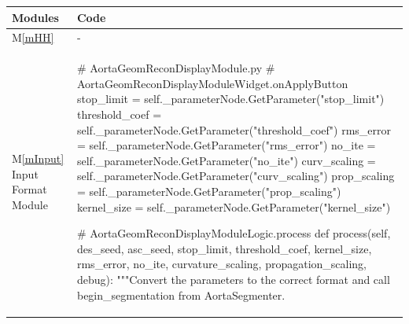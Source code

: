 \documentclass[12pt, titlepage]{article}
\newcommand{\mref}[1]{M\ref{#1}}
\begin{document}
\newpage

\begin{longtable}[H]{p{} p{} p{}}
\toprule
\multicolumn{2}{p{0.1\textwidth}}{\textbf{Modules}} & \textbf{Code}\\
\midrule
\multicolumn{2}{p{0.1\textwidth}}{\mref{mHH}} & - \\
\multicolumn{2}{p{0.1\textwidth}}{\mref{mInput} Input Format Module} & \begin{python}
# AortaGeomReconDisplayModule.py
# AortaGeomReconDisplayModuleWidget.onApplyButton
stop_limit = self._parameterNode.GetParameter("stop_limit")
threshold_coef = self._parameterNode.GetParameter("threshold_coef")
rms_error = self._parameterNode.GetParameter("rms_error")
no_ite = self._parameterNode.GetParameter("no_ite")
curv_scaling = self._parameterNode.GetParameter("curv_scaling")
prop_scaling = self._parameterNode.GetParameter("prop_scaling")
kernel_size = self._parameterNode.GetParameter("kernel_size")

# AortaGeomReconDisplayModuleLogic.process
def process(self, des_seed, asc_seed, stop_limit, threshold_coef,
            kernel_size, rms_error, no_ite, curvature_scaling,
            propagation_scaling, debug):
    """Convert the parameters to the correct format and
    call begin_segmentation from AortaSegmenter.


\end{python}
\end{longtable}
\end{document}
